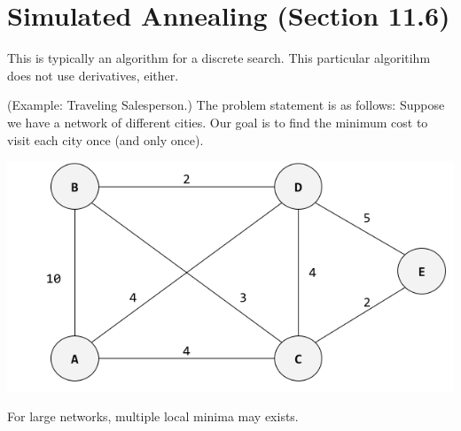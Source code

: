 \documentclass[letterpaper]{article}
\begin{document}
\section{Simulated Annealing (Section 11.6)}
This is typically an algorithm for a discrete search. This particular algoritihm does not use derivatives, either. 

\begin{mdframed}
    (Example: Traveling Salesperson.) The problem statement is as follows: Suppose we have a network of different cities. Our goal is to find the minimum cost to visit each city once (and only once).

    \begin{center}
        \includegraphics[scale=0.5]{../assets/traveling_salesperson.png}
    \end{center}

    For large networks, multiple local minima may exists.
\end{mdframed}
\end{document}
